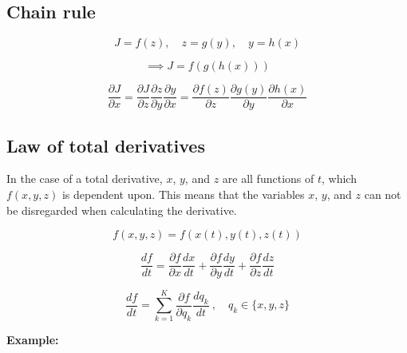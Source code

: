 \subsection{Chain rule}\label{subsec:chain-rule}

\begin{equation}\label{eq:chain-rule-functions}
    J = f(z), \quad z = g(y), \quad y = h(x)
\end{equation}

\begin{equation}\label{eq:chain-rule-composite-function}
    \implies J = f(g(h(x)))
\end{equation}

\begin{equation}\label{eq:chain-rule}
    \frac{\partial J}{\partial x} = \frac{\partial J}{\partial z} \frac{\partial z}{\partial y} \frac{\partial y}{\partial x}
    = \frac{\partial f(z)}{\partial z} \frac{\partial g(y)}{\partial y} \frac{\partial h(x)}{\partial x}
\end{equation}


\subsection{Law of total derivatives}\label{subsec:law-of-total-derivatives}

In the case of a total derivative, $x$, $y$, and $z$ are all functions of $t$, which $f(x, y, z)$ is dependent upon.
This means that the variables $x$, $y$, and $z$ can not be disregarded when calculating the derivative.

\begin{equation}\label{eq:total-derivatives-functions}
    f(x, y, z) = f(x(t), y(t), z(t))
\end{equation}

\begin{equation}\label{eq:law-of-total-derivatives}
    \frac{d f}{d t} = \frac{\partial f}{\partial x} \frac{d x}{d t} + \frac{\partial f}{\partial y} \frac{d y}{d t}
                    + \frac{\partial f}{\partial z} \frac{d z}{d t}
\end{equation}

\begin{equation}\label{eq:law-of-total-derivatives-sum}
    \frac{d f}{d t} = \sum_{k=1}^{K} \frac{\partial f}{\partial q_k} \frac{d q_k}{d t} \ , \quad q_k \in \{ x, y, z \}
\end{equation}

\textbf{Example:}

